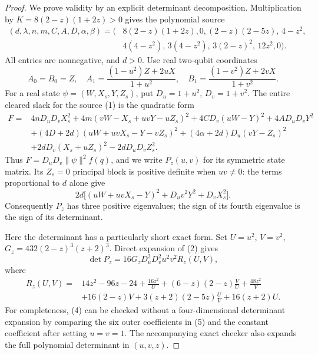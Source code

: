 \documentclass[11pt]{article}
\begin{document}
\begin{proof}
We prove validity by an explicit determinant decomposition.
Multiplication by $K=8(2-z)(1+2z)>0$ gives the polynomial source
\[
\begin{split}
 (d,\lambda,n,m,C,A,D,\alpha,\beta)
 =\bigl(&8(2-z)(1+2z),0,(2-z)(2-5z),\,4-z^2,\\
       &4(4-z^2),\,3(4-z^2),\,3(2-z)^2,\,12z^2,0\bigr).
\end{split}                                                    \tag{1}
\]
All entries are nonnegative, and $d>0$. Use real two-qubit coordinates
\[
 A_0=B_0=Z,\quad
 A_1=\frac{(1-u^2)Z+2uX}{1+u^2},\quad
 B_1=\frac{(1-v^2)Z+2vX}{1+v^2}.
\]
For a real state $\psi=(W,X_s,Y,Z_s)$, put $D_u=1+u^2$, $D_v=1+v^2$.
The entire cleared slack for the source (1) is the quadratic form
\begin{align*}
 F={}&4nD_uD_vX_s^2+4m(vW-X_s+uvY-uZ_s)^2
       +4CD_v(uW-Y)^2+4AD_uD_vY^2\\
 &+(4D+2d)(uW+uvX_s-Y-vZ_s)^2
 +(4\alpha+2d)D_u(vY-Z_s)^2\\
 &+2dD_v(X_s+uZ_s)^2-2dD_uD_vZ_s^2.
                                                               \tag{2}
\end{align*}
Thus $F=D_uD_v\|\psi\|^2 f(q)$, and we write $P_z(u,v)$ for its
symmetric state matrix. Its $Z_s=0$ principal block is positive definite
when $uv\ne0$: the terms proportional to $d$ alone give
\[
 2d\bigl[(uW+uvX_s-Y)^2+D_uv^2Y^2+D_vX_s^2\bigr].       \tag{3}
\]
Consequently $P_z$ has three positive eigenvalues; the sign of its fourth
eigenvalue is the sign of its determinant.

Here the determinant has a particularly short exact form. Set
$U=u^2$, $V=v^2$, $G_z=432(2-z)^3(z+2)^3$. Direct expansion of (2) gives
\[
 \det P_z=16G_zD_u^2D_v^2u^2v^2 R_z(U,V),                \tag{4}
\]
where
\begin{align*}
R_z(U,V)={}&14z^2-96z-24+\frac{16z^2}{U}
 +(6-z)(2-z)\frac VU+\frac{48z^2}{V}\\
 &+16(2-z)V+3(z+2)(2-5z)\frac UV+16(z+2)U.
                                                               \tag{5}
\end{align*}
For completeness, (4) can be checked without a four-dimensional
determinant expansion by comparing the six outer coefficients in (5)
and the constant coefficient after setting $u=v=1$. The accompanying
exact checker also expands the full polynomial determinant in $(u,v,z)$.


\end{proof}
\end{document}
